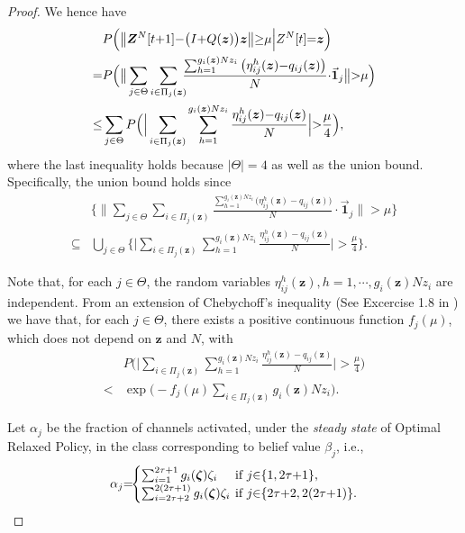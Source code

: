 \documentclass[11pt,twocolumn]{IEEEtran}
\begin{document}
\begin{proof}
We hence have
\begin{align}
&P\Big( \big\| \bm Z^{N}[t{+}1]{-}\big(I{+}Q(\bm z)\big)\bm z \big\| {\geq} \mu \Big| Z^{N}[t]{=}\bm z \Big)\nonumber\\
=& P\Big( \big\|\sum_{j\in \Theta}\sum_{i \in \Pi_j(\bm z)} \hspace{-5pt}\frac{\sum_{h=1}^{g_i(\bm z)N z_i} \big(\eta^h_{ij}(\bm z){-}q_{ij}(\bm z)\big)}{N}{\cdot} \vec{\bm 1}_{j}\big\| {>} \mu \Big) \nonumber \\
\leq & \sum_{j\in \Theta} P\Big( \Big|\sum_{i \in \Pi_j(\bm z)}\sum_{h=1}^{g_i(\bm z)N z_i}  \frac{ \eta^h_{ij}(\bm z){-}q_{ij}(\bm z)}{N}\Big| {>} \frac{\mu}{4} \Big), \label{eq:deviation}
\end{align}
where the last inequality holds because $\big|\Theta\big|=4$ as well as the union bound. Specifically, the union bound holds since
\begin{align}
&\big\{ \Big\|\sum_{j\in \Theta}\sum_{i \in \Pi_j(\bm z)} \frac{\sum_{h=1}^{g_i(\bm z)N z_i} \big(\eta^h_{ij}(\bm z){-}q_{ij}(\bm z)\big)}{N}{\cdot} \vec{\bm 1}_{j}\Big\| > \mu\big\}\nonumber\\
\subseteq& \bigcup_{j\in\Theta}\big\{\Big|\sum_{i \in \Pi_j(\bm z)}\sum_{h=1}^{g_i(\bm z)N z_i}  \frac{ \eta^h_{ij}(\bm z)-q_{ij}(\bm z)}{N}\Big| > \frac{\mu}{4} \big\}.\nonumber
\end{align}

Note that, for each $j\in \Theta$, the random variables $\eta^h_{ij}(\bm z), h=1,\cdots, g_i(\bm z)N z_i$ are independent. From an extension of Chebychoff's inequality (See Excercise 1.8 in \cite{Weiss_LD}) we have that, for each $j \in \Theta$, there exists a positive continuous function $f_{j}(\mu)$, which does not depend on $\bm z$ and $N$, with
\begin{align}
&P\Big( \Big|\sum_{i \in \Pi_j(\bm z)}\sum_{h=1}^{g_i(\bm z)N z_i} \frac{\eta^h_{ij}(\bm z)-q_{ij}(\bm z)}{N}\Big|> \frac{\mu}{4} \Big) \nonumber\\
<& \exp\big(-f_{j}(\mu) \sum_{i \in \Pi_j(\bm z)} g_i(\bm z)N z_i\big).
\end{align}

Let $\alpha_j$ be the fraction of channels activated, under the \emph{steady state} of Optimal Relaxed Policy, in the class corresponding to belief value $\beta_j$, i.e.,
\begin{align}
\alpha_j{=}\hspace{-3pt}\begin{cases}
\sum_{i=1}^{2\tau+1} g_i(\bm \zeta) \zeta_i &\hspace{-6pt}\text{if $j{\in}\{1, 2\tau{+}1\}$,} \\
\sum_{i=2\tau+2}^{2(2\tau+1)} g_i(\bm \zeta) \zeta_i &\hspace{-6pt}\text{if $j{\in}\{2\tau{+}2, 2(2\tau{+}1)\}$.}
\end{cases}
\end{align}


\end{proof}
\end{document}
